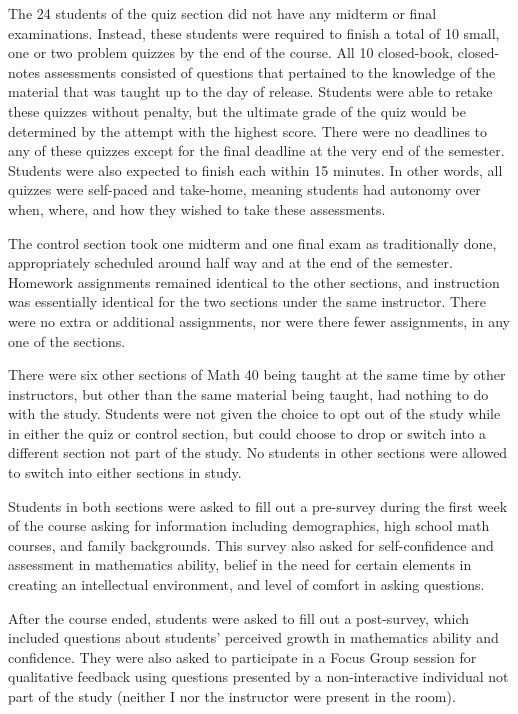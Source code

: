The 24 students of the quiz section did not have any midterm or final examinations. Instead, these students were required to finish a total of 10 small, one or two problem quizzes by the end of the course. All 10 closed-book, closed-notes assessments consisted of questions that pertained to the knowledge of the material that was taught up to the day of release. Students were able to retake these quizzes without penalty, but the ultimate grade of the quiz would be determined by the attempt with the highest score. There were no deadlines to any of these quizzes except for the final deadline at the very end of the semester. Students were also expected to finish each within 15 minutes. In other words, all quizzes were self-paced and take-home, meaning students had autonomy over when, where, and how they wished to take these assessments.

The control section took one midterm and one final exam as traditionally done, appropriately scheduled around half way and at the end of the semester. Homework assignments remained identical to the other sections, and instruction was essentially identical for the two sections under the same instructor. There were no extra or additional assignments, nor were there fewer assignments, in any one of the sections.

There were six other sections of Math 40 being taught at the same time by other instructors, but other than the same material being taught, had nothing to do with the study. Students were not given the choice to opt out of the study while in either the quiz or control section, but could choose to drop or switch into a different section not part of the study. No students in other sections were allowed to switch into either sections in study.

Students in both sections were asked to fill out a pre-survey during the first week of the course asking for information including demographics, high school math courses, and family backgrounds. This survey also asked for self-confidence and assessment in mathematics ability, belief in the need for certain elements in creating an intellectual environment, and level of comfort in asking questions.

After the course ended, students were asked to fill out a post-survey, which included questions about students' perceived growth in mathematics ability and confidence. They were also asked to participate in a Focus Group session for qualitative feedback using questions presented by a non-interactive individual not part of the study (neither I nor the instructor were present in the room).

